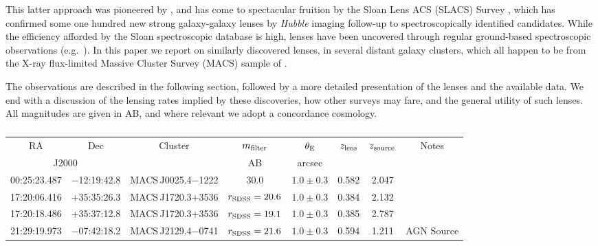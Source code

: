 \message{ !name(clashresolved.tex)}\documentclass{emulateapj}
\begin{document}
This latter approach was pioneered by \citet{warren:96}, and has come
to spectacular fruition by the Sloan Lens ACS (SLACS) Survey
\citep{bolton:08}, which has confirmed some one hundred new strong
galaxy-galaxy lenses by \emph{Hubble} imaging follow-up to
spectroscopically identified candidates.  While the efficiency
afforded by the Sloan spectroscopic database is high, lenses have been
uncovered through regular ground-based spectroscopic observations
(e.g.~\citealt{bolton:06}).  In this paper we report on similarly
discovered lenses, in several distant galaxy clusters, which all
happen to be from the X-ray flux-limited Massive Cluster Survey (MACS)
sample of \citet{ebeling:01}. 

The observations are described in the following section, followed by a
more detailed presentation of the lenses and the available data.  We
end with a discussion of the lensing rates implied by these
discoveries, how other surveys may fare, and the general utility of
such lenses. All magnitudes are given in AB, and where relevant we
adopt a concordance cosmology. 

\begin{center}
\begin{table*}[t]
\begin{center}
\caption{\label{tab:data}}
\begin{tabular}{cccccccc}
\hline\hline
\multicolumn{1}{c}{RA} & 
\multicolumn{1}{c}{Dec} & 
\multicolumn{1}{c}{Cluster} & 
\multicolumn{1}{c}{$m_{\rm filter}$} &
\multicolumn{1}{c}{$\theta_{\rm E}$} & 
\multicolumn{1}{c}{$z_{\rm lens}$} & 
\multicolumn{1}{c}{$z_{\rm source}$}&
\multicolumn{1}{c}{Notes}\\
\multicolumn{2}{c}{J2000} & 
\multicolumn{1}{c}{} & 
\multicolumn{1}{c}{AB} & 
\multicolumn{1}{c}{arcsec} & 
\multicolumn{1}{c}{} & 
\multicolumn{1}{c}{} & 
\multicolumn{1}{c}{}\\
\hline
00:25:23.487 & $-$12:19:42.8 & MACS\,J0025.4$-$1222  & $30.0$                  & $1.0\pm0.3$ & 0.582 & 2.047 & \\
17:20:06.416 & $+$35:35:26.3 & MACS\,J1720.3$+$3536 & $r_{\rm SDSS}=20.6$ & $1.0\pm0.3$ & 0.384 & 2.132 & \\
17:20:18.486 & $+$35:37:12.8 & MACS\,J1720.3$+$3536 & $r_{\rm SDSS}=19.1$ & $1.0\pm0.3$ & 0.385 & 2.787 & \\
21:29:19.973 & $-$07:42:18.2 & MACS\,J2129.4$-$0741 & $r_{\rm SDSS}=21.6$  & $1.0\pm0.3$ & 0.594 & 1.211 & AGN Source\\
\end{tabular}
\end{center}
\end{table*}
\end{center}
\end{document}
